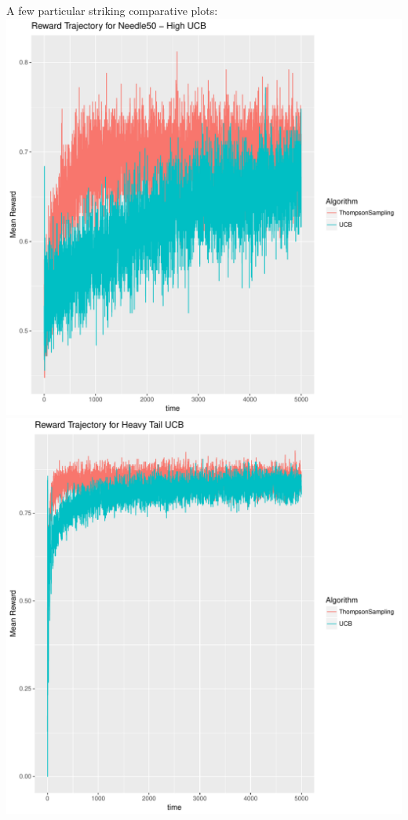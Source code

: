 \documentclass[11pt,letterpaper]{article}
\begin{document}
A few particular striking comparative plots: \\
\includegraphics[scale=0.5]{"../results/Reward Trajectory for Needle50 - High UCB"} \\
\includegraphics[scale=0.5]{"../results/Reward Trajectory for Heavy Tail UCB"} \\
\end{document}

